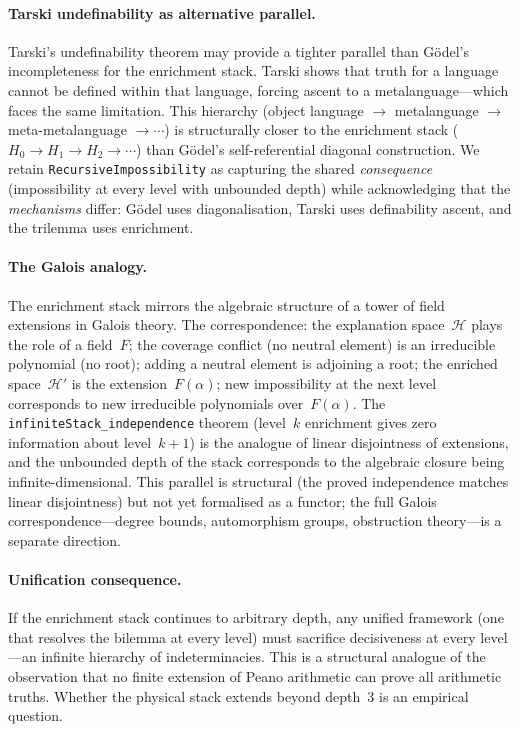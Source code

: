 \documentclass[11pt,a4paper]{article}
\newcommand{\sH}{\mathcal{H}}
\begin{document}
\paragraph{Tarski undefinability as alternative parallel.}
Tarski's undefinability theorem may provide a tighter parallel than G\"odel's incompleteness for the enrichment stack. Tarski shows that truth for a language cannot be defined within that language, forcing ascent to a metalanguage---which faces the same limitation. This hierarchy (object language $\to$ metalanguage $\to$ meta-metalanguage $\to \cdots$) is structurally closer to the enrichment stack ($H_0 \to H_1 \to H_2 \to \cdots$) than G\"odel's self-referential diagonal construction. We retain \texttt{RecursiveImpossibility} as capturing the shared \emph{consequence} (impossibility at every level with unbounded depth) while acknowledging that the \emph{mechanisms} differ: G\"odel uses diagonalisation, Tarski uses definability ascent, and the trilemma uses enrichment.

\paragraph{The Galois analogy.}
The enrichment stack mirrors the algebraic structure of a tower of field extensions in Galois theory.  The correspondence: the explanation space~$\sH$ plays the role of a field~$F$; the coverage conflict (no neutral element) is an irreducible polynomial (no root); adding a neutral element is adjoining a root; the enriched space~$\sH'$ is the extension~$F(\alpha)$; new impossibility at the next level corresponds to new irreducible polynomials over~$F(\alpha)$.  The \texttt{infiniteStack\_independence} theorem (level~$k$ enrichment gives zero information about level~$k+1$) is the analogue of linear disjointness of extensions, and the unbounded depth of the stack corresponds to the algebraic closure being infinite-dimensional.  This parallel is structural (the proved independence matches linear disjointness) but not yet formalised as a functor; the full Galois correspondence---degree bounds, automorphism groups, obstruction theory---is a separate direction.

\paragraph{Unification consequence.}
If the enrichment stack continues to arbitrary depth, any unified framework (one that resolves the bilemma at every level) must sacrifice decisiveness at every level---an infinite hierarchy of indeterminacies. This is a structural analogue of the observation that no finite extension of Peano arithmetic can prove all arithmetic truths. Whether the physical stack extends beyond depth~3 is an empirical question.
\end{document}
